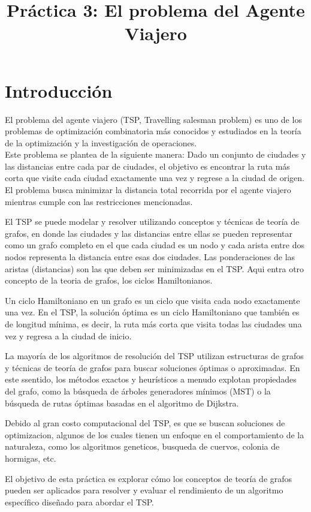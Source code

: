 \documentclass[]{report}
\title{Práctica 3: El problema del Agente Viajero}
\author{}
\begin{document}
\maketitle
	
	\section{Introducción}
	El problema del agente viajero (TSP, Travelling salesman problem) es uno de los problemas de optimización combinatoria más conocidos y estudiados en la teoría de la optimización y la investigación de operaciones.\\
	Este problema se plantea de la siguiente manera: Dado un conjunto de ciudades y las distancias entre cada par de ciudades, el objetivo es encontrar la ruta más corta que visite cada ciudad exactamente una vez y regrese a la ciudad de origen. El problema busca minimizar la distancia total recorrida por el agente viajero mientras cumple con las restricciones mencionadas.
	
	El TSP se puede modelar y resolver utilizando conceptos y técnicas de teoría de grafos, en donde las ciudades y las distancias entre ellas se pueden representar como un grafo completo en el que cada ciudad es un nodo y cada arista entre dos nodos representa la distancia entre esas dos ciudades. Las ponderaciones de las aristas (distancias) son las que deben ser minimizadas en el TSP. Aqui entra otro concepto de la teoria de grafos, los ciclos Hamiltonianos.
	
	Un ciclo Hamiltoniano en un grafo es un ciclo que visita cada nodo exactamente una vez. En el TSP, la solución óptima es un ciclo Hamiltoniano que también es de longitud mínima, es decir, la ruta más corta que visita todas las ciudades una vez y regresa a la ciudad de inicio.
	
	La mayoría de los algoritmos de resolución del TSP utilizan estructuras de grafos y técnicas de teoría de grafos para buscar soluciones óptimas o aproximadas. En este ssentido, los métodos exactos y heurísticos a menudo explotan propiedades del grafo, como la búsqueda de árboles generadores mínimos (MST) o la búsqueda de rutas óptimas basadas en el algoritmo de Dijkstra.
	
	Debido al gran costo computacional del TSP, es que se buscan soluciones de optimizacion, algunos de los cuales tienen un enfoque en el comportamiento de la naturaleza, como los algoritmos geneticos, busqueda de cuervos, colonia de hormigas, etc.
	
	El objetivo de esta práctica es explorar cómo los conceptos de teoría de grafos pueden ser aplicados para resolver y evaluar el rendimiento de un algoritmo específico diseñado para abordar el TSP.
\end{document}
